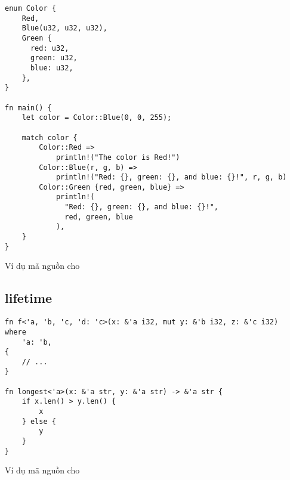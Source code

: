 \begin{listing}[H]
\begin{verbatim}
enum Color {
    Red,
    Blue(u32, u32, u32),
    Green {
      red: u32,
      green: u32,
      blue: u32,
    },
}

fn main() {
    let color = Color::Blue(0, 0, 255);

    match color {
        Color::Red =>
            println!("The color is Red!")
        Color::Blue(r, g, b) =>
            println!("Red: {}, green: {}, and blue: {}!", r, g, b)
        Color::Green {red, green, blue} =>
            println!(
              "Red: {}, green: {}, and blue: {}!",
              red, green, blue
            ),
    }
}
\end{verbatim}
\caption{Ví dụ mã nguồn cho}
\label{code:c3_letelse}
\end{listing}

\subsection{lifetime}

\begin{listing}[H]
\begin{verbatim}
fn f<'a, 'b, 'c, 'd: 'c>(x: &'a i32, mut y: &'b i32, z: &'c i32)
where
    'a: 'b,
{
    // ...
}

fn longest<'a>(x: &'a str, y: &'a str) -> &'a str {
    if x.len() > y.len() {
        x
    } else {
        y
    }
}
\end{verbatim}
\caption{Ví dụ mã nguồn cho}
\label{code:c3_lifetime}
\end{listing}

